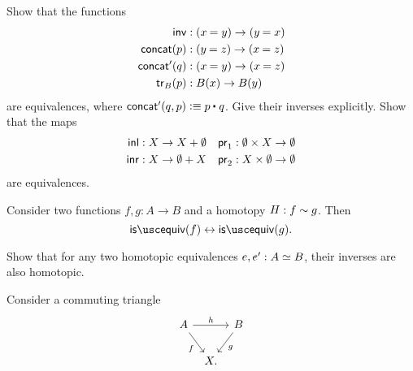 \begin{exercises}
  \exercise \label{ex:equiv_grpd_ops}Show that the functions
  \begin{align*}
    \invfunc & :(\id{x}{y})\to(\id{y}{x}) \\
    \concat(p) & : (\id{y}{z})\to(\id{x}{z}) \\
    \concat'(q) & : (\id{x}{y}) \to (\id{x}{z}) \\
    \tr_B(p) & :B(x)\to B(y)
  \end{align*}
  are equivalences, where $\concat'(q,p)\defeq \ct{p}{q}$. Give their inverses explicitly.
  \exercise \label{ex:unit-laws-coprod}Show that the maps
  \begin{align*}
    {\mathsf{inl}} & : X \to X+\emptyset &     \mathsf{pr}_{1} & : \emptyset \times X \to \emptyset \\
    {\mathsf{inr}} & : X \to \emptyset+X &    \mathsf{pr}_{2} & : X \times \emptyset \to \emptyset
  \end{align*}
  are equivalences.
  \exercise
  \begin{subexenum}
  \item \label{ex:htpy_equiv} Consider two functions $f,g:A\to B$ and a homotopy $H:f\sim g$. Then
    \begin{equation*}
      \isequiv(f)\leftrightarrow\isequiv(g).
    \end{equation*}
  \item Show that for any two homotopic equivalences $e,e':\eqv{A}{B}$, their inverses are also homotopic.
  \end{subexenum}
  \exercise \label{ex:3_for_2}
  Consider a commuting triangle
  \begin{equation*}
    \begin{tikzcd}[column sep=tiny]
      A \arrow[rr,"h"] \arrow[dr,swap,"f"] & & B \arrow[dl,"g"] \\
      & X.
    \end{tikzcd}
  \end{equation*}

\end{exercises}
